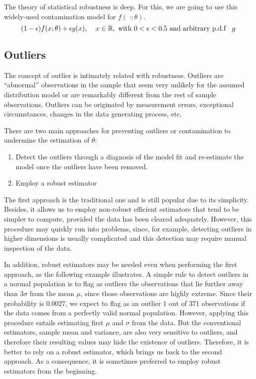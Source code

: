 The theory of statistical robustness is deep. For this, we are going to use this
widely-used contamination model for $f(\;\cdot;\theta)$.
\[ (1-\epsilon)f(x;\theta) + \epsilon g(x),\;\;\;\; x \in \mathbb{R},\\
\text{ with } 0<\epsilon<0.5 \\ \text{ and arbitrary p.d.f }\;\; g\]

\subsection{Outliers}
The concept of outlier is intimately related with robustness. Outliers are
“abnormal” observations in the sample that seem very unlikely for the assumed
distribution model or are remarkably different from the rest of sample
observations. Outliers can be originated by measurement errors, exceptional
circumstances, changes in the data generating process, etc.

There are two main approaches for preventing outliers or contamination to
undermine the estimation of $\theta$:
\begin{enumerate}
    \item Detect the outliers through a diagnosis of the model fit and
    re-estimate the model once the outliers have been removed.
    \item Employ a robust estimator
\end{enumerate}

The first approach is the traditional one and is still popular due to its
simplicity. Besides, it allows us to employ non-robust efficient estimators that
tend to be simpler to compute, provided the data has been cleared adequately.
However, this procedure may quickly run into problems, since, for example,
detecting outliers in higher dimensions is usually complicated and this
detection may require manual inspection of the data.

In addition, robust estimators may be needed even when performing the first
approach, as the following example illustrates. A simple rule to detect outliers
in a normal population is to flag as outliers the observations that lie further
away than $3\sigma$ from the mean $\mu$, since those observations are highly
extreme. Since their probability is $0.0027$, we expect to flag as an outlier
$1$ out of $371$ observations if the data comes from a perfectly valid normal
population. However, applying this procedure entails estimating first $\mu$ and
$\sigma$ from the data. But the conventional estimators, sample mean and
variance, are also very sensitive to outliers, and therefore their resulting
values may hide the existence of outliers. Therefore, it is better to rely on a
robust estimator, which brings us back to the second approach. As a consequence,
it is sometimes preferred to employ robust estimators from the beginning.

